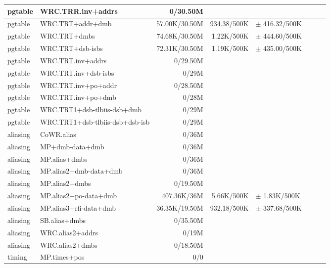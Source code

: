 \begin{tabular}{l l  | r r l | r r l}
\hline
   pgtable&WRC.TRR.inv+addrs&0/30.50M&&&\\
\hline
   pgtable&WRC.TRT+addr+dmb&57.00K/30.50M&934.38/500K&$\pm$ 416.32/500K&\\
\hline
   pgtable&WRC.TRT+dmbs&74.68K/30.50M&1.22K/500K&$\pm$ 444.60/500K&\\
\hline
   pgtable&WRC.TRT+dsb-isbs&72.31K/30.50M&1.19K/500K&$\pm$ 435.00/500K&\\
\hline
   pgtable&WRC.TRT.inv+addrs&0/29.50M&&&\\
\hline
   pgtable&WRC.TRT.inv+dsb-isbs&0/29M&&&\\
\hline
   pgtable&WRC.TRT.inv+po+addr&0/28.50M&&&\\
\hline
   pgtable&WRC.TRT.inv+po+dmb&0/28M&&&\\
\hline
   pgtable&WRC.TRT1+dsb-tlbiis-dsb+dmb&0/29M&&&\\
\hline
   pgtable&WRC.TRT1+dsb-tlbiis-dsb+dsb-isb&0/29M&&&\\
\hline
   aliasing&CoWR.alias&0/36M&&&\\
\hline
   aliasing&MP+dmb-data+dmb&0/36M&&&\\
\hline
   aliasing&MP.alias+dmbs&0/36M&&&\\
\hline
   aliasing&MP.alias2+dmb-data+dmb&0/36M&&&\\
\hline
   aliasing&MP.alias2+dmbs&0/19.50M&&&\\
\hline
   aliasing&MP.alias2+po-data+dmb&407.36K/36M&5.66K/500K&$\pm$ 1.83K/500K&\\
\hline
   aliasing&MP.alias3+rfi-data+dmb&36.35K/19.50M&932.18/500K&$\pm$ 337.68/500K&\\
\hline
   aliasing&SB.alias+dmbs&0/35.50M&&&\\
\hline
   aliasing&WRC.alias2+addrs&0/19M&&&\\
\hline
   aliasing&WRC.alias2+dmbs&0/18.50M&&&\\
\hline
   timing&MP.times+pos&0/0&&&\\
\hline
\hline
\end{tabular}
